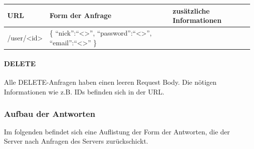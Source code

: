 \begin{center}
\begin{longtable}{| p{4.1cm} | p{5cm} | p{3cm} |}
\hline
URL & Form der Anfrage & zusätzliche Informationen \\
\hline \hline
/user/<id> & \{ ``nick'':``<>'', ``password'':``<>'', ``email'':``<>'' \} & \\
\hline
\end{longtable}
\end{center}

\paragraph{DELETE}
Alle DELETE-Anfragen haben einen leeren Request Body. Die nötigen Informationen wie z.B. IDs befinden sich in der URL.

\subsubsection{Aufbau der Antworten}
Im folgenden befindet sich eine Auflistung der Form der Antworten, die der Server nach Anfragen des Servers zurückschickt.


